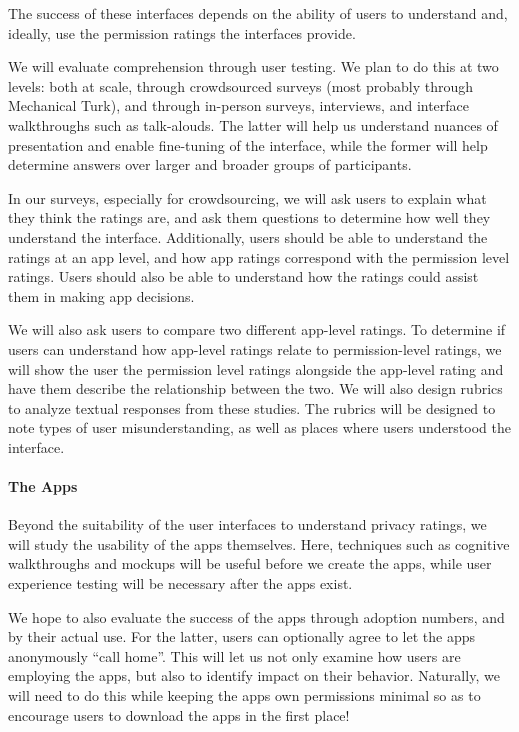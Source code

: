 \documentclass[11pt]{article}
\begin{document}
The success of these interfaces depends on the ability of users to
understand and, ideally, use the permission ratings the interfaces provide.

We will evaluate comprehension through user testing. We plan to do
this at two levels: both at scale, through crowdsourced surveys (most
probably through Mechanical Turk), and through in-person surveys,
interviews, and interface walkthroughs such as talk-alouds. The latter
will help us understand nuances of presentation and enable fine-tuning
of the interface, while the former will help determine answers over
larger and broader groups of participants.

In our surveys, especially for crowdsourcing, we will ask users to
explain what they think the ratings are, and ask them questions to
determine how well they understand the interface.  Additionally, users
should be able to understand the ratings at an app level, and
how app ratings correspond with the permission level
ratings. Users should also be able to understand how the ratings could
assist them in making app decisions.

We will also ask users to compare two different app-level ratings. To
determine if users can understand how app-level ratings relate to
permission-level ratings, we will show the user the permission
level ratings alongside the app-level rating and have them describe the relationship
between the two. We will also design rubrics to analyze textual
responses from these studies. The rubrics will be designed to note
types of user misunderstanding, as well as places where users
understood the interface.

\paragraph{The Apps}

Beyond the suitability of the user interfaces to understand privacy
ratings, we will study the usability of the apps themselves. Here,
techniques such as cognitive walkthroughs \cite{cog-walkthrough-IJMMS92} 
and mockups will be
useful before we create the apps, while user experience testing will
be necessary after the apps exist.

We hope to also evaluate the success of the apps through adoption
numbers, and by their actual use. For the latter, users can optionally
agree to let the apps anonymously ``call home''. This will let us not
only examine how users are employing the apps, but also to identify
impact on their behavior. Naturally, we will need to do this while
keeping the apps own permissions minimal so as to encourage users to
download the apps in the first place!
\end{document}

